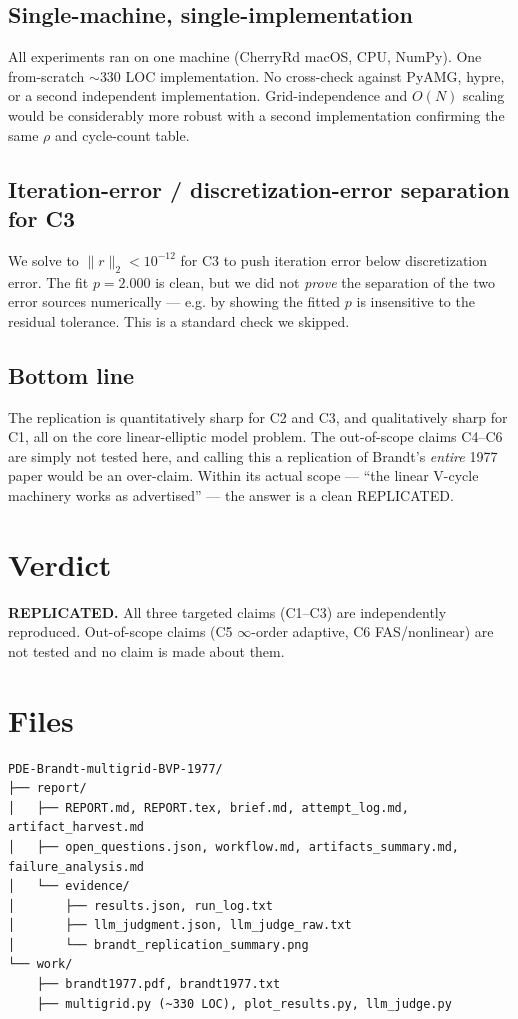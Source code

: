 \documentclass[11pt]{article}
\begin{document}
\subsection{Single-machine, single-implementation}
All experiments ran on one machine (CherryRd macOS, CPU, NumPy). One from-scratch $\sim$330 LOC implementation. No cross-check against PyAMG, hypre, or a second independent implementation. Grid-independence and $O(N)$ scaling would be considerably more robust with a second implementation confirming the same $\rho$ and cycle-count table.

\subsection{Iteration-error / discretization-error separation for C3}
We solve to $\|r\|_2 < 10^{-12}$ for C3 to push iteration error below discretization error. The fit $p = 2.000$ is clean, but we did not \emph{prove} the separation of the two error sources numerically --- e.g. by showing the fitted $p$ is insensitive to the residual tolerance. This is a standard check we skipped.

\subsection{Bottom line}
The replication is quantitatively sharp for C2 and C3, and qualitatively sharp for C1, all on the core linear-elliptic model problem. The out-of-scope claims C4--C6 are simply not tested here, and calling this a replication of Brandt's \emph{entire} 1977 paper would be an over-claim. Within its actual scope --- ``the linear V-cycle machinery works as advertised'' --- the answer is a clean REPLICATED.

\section{Verdict}
\textbf{REPLICATED.} All three targeted claims (C1--C3) are independently reproduced. Out-of-scope claims (C5 $\infty$-order adaptive, C6 FAS/nonlinear) are not tested and no claim is made about them.

\section{Files}
\begin{lstlisting}
PDE-Brandt-multigrid-BVP-1977/
├── report/
│   ├── REPORT.md, REPORT.tex, brief.md, attempt_log.md, artifact_harvest.md
│   ├── open_questions.json, workflow.md, artifacts_summary.md, failure_analysis.md
│   └── evidence/
│       ├── results.json, run_log.txt
│       ├── llm_judgment.json, llm_judge_raw.txt
│       └── brandt_replication_summary.png
└── work/
    ├── brandt1977.pdf, brandt1977.txt
    ├── multigrid.py (~330 LOC), plot_results.py, llm_judge.py
\end{lstlisting}
\end{document}
